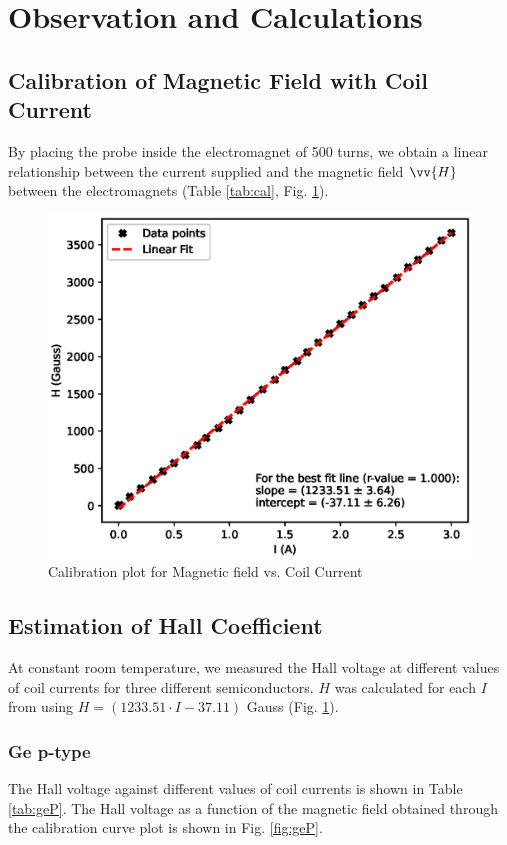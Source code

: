 \section{Observation and Calculations}

\subsection{Calibration of Magnetic Field with Coil Current}
By placing the probe inside the electromagnet of 500 turns, we obtain a linear relationship between the current supplied and the magnetic field $\vv{H}$ between the electromagnets (Table \ref{tab:cal}, Fig. \ref{calf}).


\begin{figure}[H]
    \centering
    \includegraphics[width=1\columnwidth]{images/cal.eps}
    \caption{Calibration plot for Magnetic field vs. Coil Current}
    \label{calf}
\end{figure}

\subsection{Estimation of Hall Coefficient}

At constant room temperature, we measured the Hall voltage at different values of coil currents for three different semiconductors. 
$H$ was calculated for each $I$ from using $H = (1233.51\cdot I - 37.11)$ Gauss (Fig. \ref{calf}).
\vspace{-1em}
\subsubsection{Ge p-type}
The Hall voltage against different values of coil currents is shown in Table \ref{tab:geP}. The Hall voltage as a function of the magnetic field obtained through the calibration curve plot is shown in Fig. \ref{fig:geP}.

